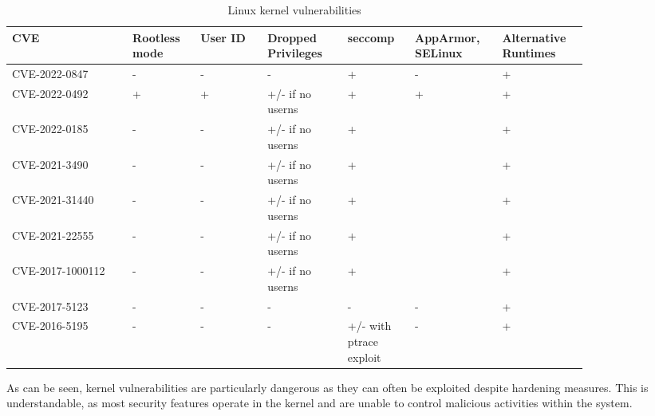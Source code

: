 \begin{table}[H]
    \centering \small
    \begin{tabular}{| p{0.18\linewidth} | p{0.1\linewidth} | p{0.1\linewidth} | p{0.12\linewidth} | p{0.1\linewidth} | p{0.12\linewidth} | p{0.12\linewidth} |} \hline
    CVE & Rootless mode & User ID & Dropped Privileges & seccomp & AppArmor, SELinux & Alternative Runtimes \\ \hline
    CVE-2022-0847 & - & - & - & \cellcolor{green!25} + & - & \cellcolor{green!25} +  \\ \hline
    CVE-2022-0492 & \cellcolor{green!25} + & \cellcolor{green!25} + & \cellcolor{yellow!25} +/- \linebreak if no userns & \cellcolor{green!25} + & \cellcolor{green!25} + & \cellcolor{green!25} + \\ \hline
    CVE-2022-0185 & - & - & \cellcolor{yellow!25} +/- \linebreak if no userns & \cellcolor{green!25} + &  & \cellcolor{green!25} + \\ \hline
    CVE-2021-3490 & - & - & \cellcolor{yellow!25} +/- \linebreak if no userns & \cellcolor{green!25} + &  & \cellcolor{green!25} + \\ \hline
    CVE-2021-31440 & - & - & \cellcolor{yellow!25} +/- \linebreak if no userns & \cellcolor{green!25} + &  & \cellcolor{green!25} + \\ \hline
    CVE-2021-22555 & - & - & \cellcolor{yellow!25} +/- \linebreak if no userns & \cellcolor{green!25} + &  & \cellcolor{green!25} + \\ \hline
    CVE-2017-1000112 & - & - & \cellcolor{yellow!25} +/- \linebreak if no userns & \cellcolor{green!25} + &  & \cellcolor{green!25} + \\ \hline
    CVE-2017-5123 & - & - & - & - & - & \cellcolor{green!25} + \\ \hline
    CVE-2016-5195 & - & - & - & \cellcolor{yellow!25} +/- \linebreak with ptrace exploit & - & \cellcolor{green!25} + \\ \hline
\end{tabular}
    \caption{Linux kernel vulnerabilities}
    \label{tab:h:10}
\end{table}

As can be seen, kernel vulnerabilities are particularly dangerous as they can often be exploited despite hardening measures. This is understandable, as most security features operate in the kernel and are unable to control malicious activities within the system.

